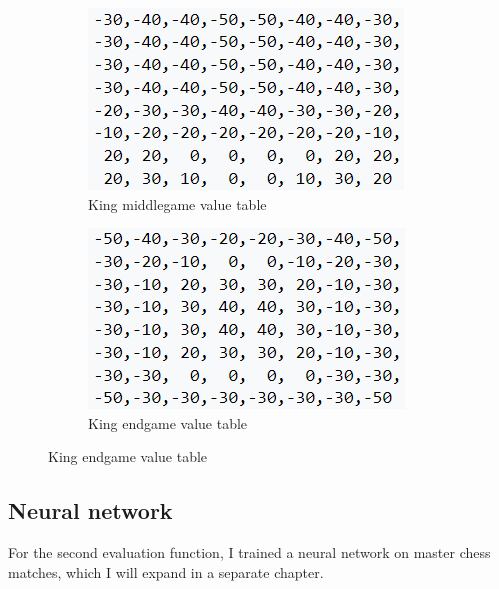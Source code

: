 \begin{figure}[h]
    \centering
    \caption{King value tables}
    \begin{subfigure}{0.49\textwidth}
        \centering
        \includegraphics{figures/king_value_table_middlegame.png}
        \caption{King middlegame value table}
        \label{fig:kingValueTableMiddlegame}
    \end{subfigure}
    \begin{subfigure}{0.49\textwidth}
        \centering
        \includegraphics{figures/king_value_table_endgame.png}
        \caption{King endgame value table}
        \label{fig:kingValueTableEndgame}
    \end{subfigure}
\end{figure}

\subsection{Neural network}
\label{subsec:ch4sec3subsec2}

For the second evaluation function, I trained a neural network on master chess matches, which I will expand in a separate chapter.